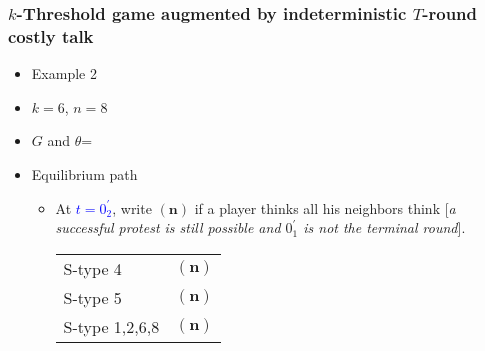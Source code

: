 \documentclass[9pt,handout]{beamer}
\begin{document}
\begin{frame}
  \frametitle{$k$-Threshold game augmented by indeterministic $T$-round costly talk}

\begin{itemize}
\item Example 2
\item $k=6$, $n=8$
\item $G$ and $\theta$=
\begin{center}
\end{center}
\end{itemize}

\begin{itemize}
\item Equilibrium path
\begin{itemize}
\item 
{
At \textcolor{blue}{$t=0^{'}_2$}, write $({\textbf{n}})$ if a player thinks all his neighbors think \alert{[}\textit{a successful protest is still possible and $0^{'}_1$ is not the terminal round}\alert{]}. 
\begin{table}[h]
\begin{tabular}{ll }
S-type 4 & $({\textbf{n}})$\\
S-type 5 & $({\textbf{n}})$\\
S-type 1,2,6,8 & $({\textbf{n}})$
\end{tabular}
\end{table}
} 
\end{itemize}

\end{itemize}
\end{frame}
\end{document}
